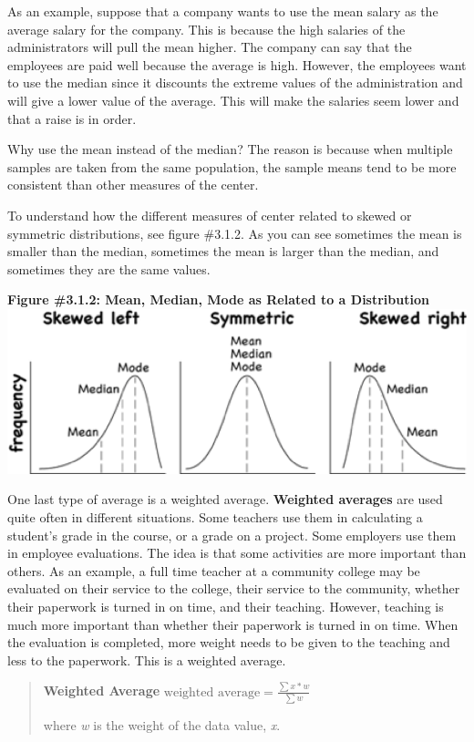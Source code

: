 \documentclass[]{book}
\begin{document}
As an example, suppose that a company wants to use the mean salary as the average salary for the company. This is because the high salaries of the administrators will pull the mean higher. The company can say that the employees are paid well because the average is high. However, the employees want to use the median since it discounts the extreme values of the administration and will give a lower value of the average. This will make the salaries seem lower and that a raise is in order.

Why use the mean instead of the median? The reason is because when multiple samples are taken from the same population, the sample means tend to be more consistent than other measures of the center.

To understand how the different measures of center related to skewed or symmetric distributions, see figure \#3.1.2. As you can see sometimes the mean is smaller than the median, sometimes the mean is
larger than the median, and sometimes they are the same values.

\textbf{Figure \#3.1.2: Mean, Median, Mode as Related to a Distribution}
\includegraphics{centers_distribution.png}

One last type of average is a weighted average. \textbf{Weighted averages} are used quite often in different situations. Some teachers use them in calculating a student's grade in the course, or a grade on a project. Some employers use them in employee evaluations. The idea is that some activities are more
important than others. As an example, a full time teacher at a community college may be evaluated on their service to the college, their service to the community, whether their paperwork is turned in on time, and their teaching. However, teaching is much more important than whether their paperwork is turned in on time. When the evaluation is completed, more weight needs to be given to the teaching and less to the paperwork. This is a weighted average.

\begin{quote}
\textbf{Weighted Average}
\(\text{weighted average}=\frac{\sum{x*w}}{\sum{w}}\)

where \emph{w} is the weight of the data value, \emph{x}.
\end{quote}
\end{document}
